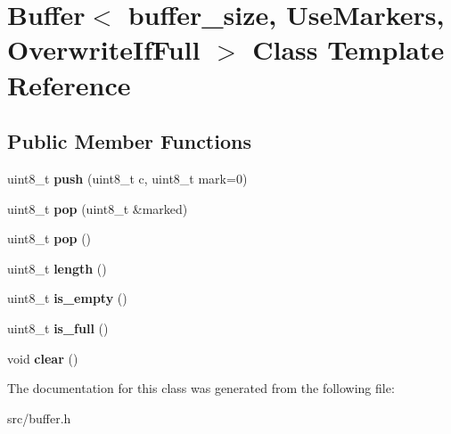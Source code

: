 \hypertarget{classBuffer}{}\section{Buffer$<$ buffer\+\_\+size, Use\+Markers, Overwrite\+If\+Full $>$ Class Template Reference}
\label{classBuffer}
\subsection*{Public Member Functions}
\begin{DoxyCompactItemize}
\item 
uint8\+\_\+t {\bfseries push} (uint8\+\_\+t c, uint8\+\_\+t mark=0)\hypertarget{classBuffer_a1ca7045e009384d8eaff94b7518058eb}{}\label{classBuffer_a1ca7045e009384d8eaff94b7518058eb}

\item 
uint8\+\_\+t {\bfseries pop} (uint8\+\_\+t \&marked)\hypertarget{classBuffer_a19f5c6bd4c300bf47929cee37acb3e57}{}\label{classBuffer_a19f5c6bd4c300bf47929cee37acb3e57}

\item 
uint8\+\_\+t {\bfseries pop} ()\hypertarget{classBuffer_a245e9f05625b8baa166c925161557043}{}\label{classBuffer_a245e9f05625b8baa166c925161557043}

\item 
uint8\+\_\+t {\bfseries length} ()\hypertarget{classBuffer_a8ba075fa0afc01604b3ea29fd4785dc8}{}\label{classBuffer_a8ba075fa0afc01604b3ea29fd4785dc8}

\item 
uint8\+\_\+t {\bfseries is\+\_\+empty} ()\hypertarget{classBuffer_af065fa47b206c64cebc30cc39cf23e9c}{}\label{classBuffer_af065fa47b206c64cebc30cc39cf23e9c}

\item 
uint8\+\_\+t {\bfseries is\+\_\+full} ()\hypertarget{classBuffer_a57072cfbd2259df62aeb5f40245b0f93}{}\label{classBuffer_a57072cfbd2259df62aeb5f40245b0f93}

\item 
void {\bfseries clear} ()\hypertarget{classBuffer_a521c50ae0048af777bdbb930e2c5b5d3}{}\label{classBuffer_a521c50ae0048af777bdbb930e2c5b5d3}

\end{DoxyCompactItemize}


The documentation for this class was generated from the following file\+:\begin{DoxyCompactItemize}
\item 
src/buffer.\+h\end{DoxyCompactItemize}
